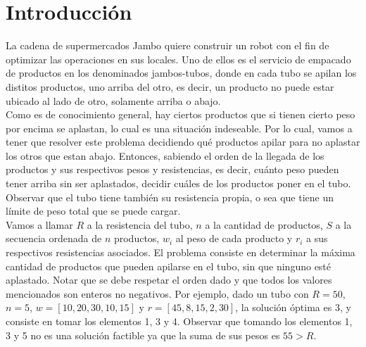 \documentclass[10pt,a4paper]{article}
\begin{document}

\fecha{}


\maketitle
\thispagestyle{empty}

\newpage

\setcounter{page}{1}

\section{Introducción} \label{sec:introduccion}

La cadena de supermercados Jambo quiere construir un robot con el fin de optimizar las operaciones en sus locales. Uno de ellos es el servicio de empacado de productos en los denominados jambos-tubos, donde en cada tubo se apilan los distitos productos, uno arriba del otro, es decir, un producto no puede estar ubicado al lado de otro, solamente arriba o abajo.\\

Como es de conocimiento general, hay ciertos productos que si tienen cierto peso por encima se aplastan, lo cual es una situaci\'on indeseable. Por lo cual, vamos a tener que resolver este problema decidiendo qu\'e productos apilar para no aplastar los otros que estan abajo. Entonces, sabiendo el orden de la llegada de los productos y sus respectivos pesos y resistencias, es decir, cu\'anto peso pueden tener arriba sin ser aplastados, decidir cu\'ales de los productos poner en el tubo. Observar que el tubo tiene tambi\'en su resistencia propia, o sea que tiene un l\'imite de peso total que se puede cargar.\\

Vamos a llamar $R$ a la resistencia del tubo, $n$ a la cantidad de productos, $S$ a la secuencia ordenada de $n$ productos, $w_i$ al peso de cada producto y $r_i$ a sus respectivos resistencias asociados. El problema consiste en determinar la máxima cantidad de productos que pueden apilarse en el tubo, sin que ninguno esté aplastado. Notar que se debe respetar el orden dado y que todos los valores mencionados son enteros no negativos. Por ejemplo, dado un tubo con $R = 50$, $n = 5$, $w = [10, 20, 30, 10, 15]$ y $r = [45, 8, 15, 2, 30]$, la soluci\'on \'optima es 3, y consiste en tomar los elementos 1, 3 y 4. Observar que tomando los elementos 1, 3 y 5 no es una soluci\'on factible ya que la suma de sus pesos es $55 > R$.\\
\end{document}
